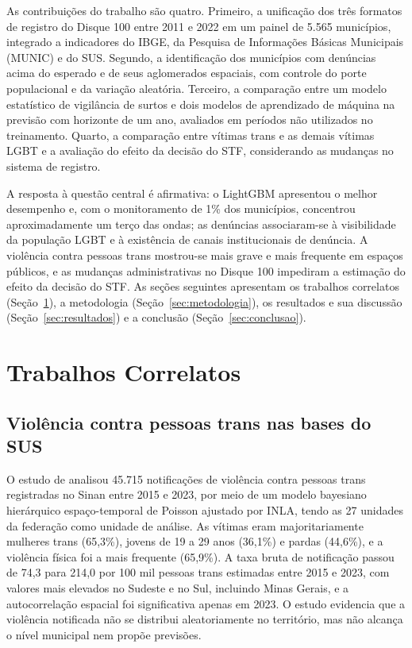 \documentclass[12pt]{article}
\begin{document}
As contribuições do trabalho são quatro. Primeiro, a unificação dos três formatos de registro do Disque 100 entre 2011 e 2022 em um painel de 5.565 municípios, integrado a indicadores do IBGE, da Pesquisa de Informações Básicas Municipais (MUNIC) e do SUS. Segundo, a identificação dos municípios com denúncias acima do esperado e de seus aglomerados espaciais, com controle do porte populacional e da variação aleatória. Terceiro, a comparação entre um modelo estatístico de vigilância de surtos e dois modelos de aprendizado de máquina na previsão com horizonte de um ano, avaliados em períodos não utilizados no treinamento. Quarto, a comparação entre vítimas trans e as demais vítimas LGBT e a avaliação do efeito da decisão do STF, considerando as mudanças no sistema de registro.

A resposta à questão central é afirmativa: o LightGBM apresentou o melhor desempenho e, com o monitoramento de 1\% dos municípios, concentrou aproximadamente um terço das ondas; as denúncias associaram-se à visibilidade da população LGBT e à existência de canais institucionais de denúncia. A violência contra pessoas trans mostrou-se mais grave e mais frequente em espaços públicos, e as mudanças administrativas no Disque 100 impediram a estimação do efeito da decisão do STF. As seções seguintes apresentam os trabalhos correlatos (Seção~\ref{sec:correlatos}), a metodologia (Seção~\ref{sec:metodologia}), os resultados e sua discussão (Seção~\ref{sec:resultados}) e a conclusão (Seção~\ref{sec:conclusao}).


\clearpage
\section{Trabalhos Correlatos}
\label{sec:correlatos}

\subsection{Violência contra pessoas trans nas bases do SUS}

O estudo de \cite{leal_silva_lizzi:2026} analisou 45.715 notificações de violência contra pessoas trans registradas no Sinan entre 2015 e 2023, por meio de um modelo bayesiano hierárquico espaço-temporal de Poisson ajustado por INLA, tendo as 27 unidades da federação como unidade de análise. As vítimas eram majoritariamente mulheres trans (65,3\%), jovens de 19 a 29 anos (36,1\%) e pardas (44,6\%), e a violência física foi a mais frequente (65,9\%). A taxa bruta de notificação passou de 74,3 para 214,0 por 100 mil pessoas trans estimadas entre 2015 e 2023, com valores mais elevados no Sudeste e no Sul, incluindo Minas Gerais, e a autocorrelação espacial foi significativa apenas em 2023. O estudo evidencia que a violência notificada não se distribui aleatoriamente no território, mas não alcança o nível municipal nem propõe previsões.
\end{document}
